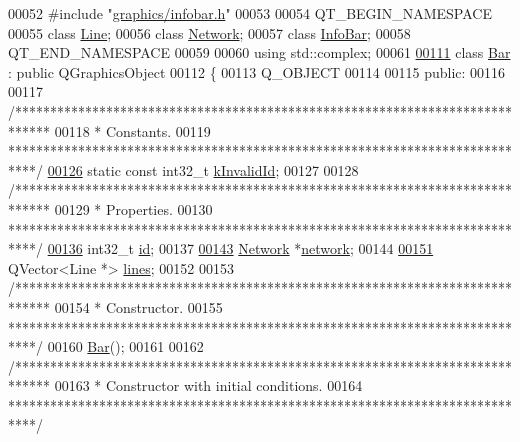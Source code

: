 \begin{DoxyCode}
00052 \textcolor{preprocessor}{#include "\hyperlink{infobar_8h}{graphics/infobar.h}"}
00053 
00054 QT\_BEGIN\_NAMESPACE
00055 \textcolor{keyword}{class }\hyperlink{class_line}{Line};
00056 \textcolor{keyword}{class }\hyperlink{class_network}{Network};
00057 \textcolor{keyword}{class }\hyperlink{class_info_bar}{InfoBar};
00058 QT\_END\_NAMESPACE
00059 
00060 \textcolor{keyword}{using} std::complex;
00061 
\hypertarget{bar_8h_source_l00111}{}\hyperlink{class_bar}{00111} \textcolor{keyword}{class }\hyperlink{class_bar}{Bar} : \textcolor{keyword}{public} QGraphicsObject
00112 \{
00113   Q\_OBJECT
00114 
00115 \textcolor{keyword}{public}:
00116 
00117   \textcolor{comment}{/*****************************************************************************}
00118 \textcolor{comment}{   * Constants.}
00119 \textcolor{comment}{   ****************************************************************************/}
\hypertarget{bar_8h_source_l00126}{}\hyperlink{group___models_ga9919592c0397ed41448dfb20b607d738}{00126}   \textcolor{keyword}{static} \textcolor{keyword}{const} int32\_t \hyperlink{group___models_ga9919592c0397ed41448dfb20b607d738}{kInvalidId};
00127 
00128   \textcolor{comment}{/*****************************************************************************}
00129 \textcolor{comment}{   * Properties.}
00130 \textcolor{comment}{   ****************************************************************************/}
\hypertarget{bar_8h_source_l00136}{}\hyperlink{class_bar_a9dc5c6a6d44fe412ae34ef8a881b8dce}{00136}   int32\_t \hyperlink{class_bar_a9dc5c6a6d44fe412ae34ef8a881b8dce}{id};
00137 
\hypertarget{bar_8h_source_l00143}{}\hyperlink{class_bar_a80025f13884750add58cc61b318357ff}{00143}   \hyperlink{class_network}{Network} *\hyperlink{class_bar_a80025f13884750add58cc61b318357ff}{network};
00144 
\hypertarget{bar_8h_source_l00151}{}\hyperlink{class_bar_a23b6d4319352ef0e77ad66aade4e0209}{00151}   QVector<Line *> \hyperlink{class_bar_a23b6d4319352ef0e77ad66aade4e0209}{lines};
00152 
00153   \textcolor{comment}{/*****************************************************************************}
00154 \textcolor{comment}{   * Constructor.}
00155 \textcolor{comment}{   ****************************************************************************/}
00160   \hyperlink{group___models_ga9cae2188fcc6cce41caa7898c64548d1}{Bar}();
00161 
00162   \textcolor{comment}{/*****************************************************************************}
00163 \textcolor{comment}{   * Constructor with initial conditions.}
00164 \textcolor{comment}{   ****************************************************************************/}

\end{DoxyCode}
